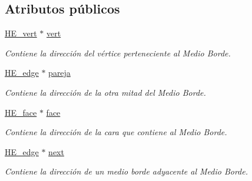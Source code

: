 \subsection*{Atributos públicos}
\begin{DoxyCompactItemize}
\item 
\hypertarget{class_h_e__edge_a0f2948558eb5c7e4c3b6d06df8c371d2}{\hyperlink{class_h_e__vert}{H\-E\-\_\-vert} $\ast$ \hyperlink{class_h_e__edge_a0f2948558eb5c7e4c3b6d06df8c371d2}{vert}}\label{class_h_e__edge_a0f2948558eb5c7e4c3b6d06df8c371d2}

\begin{DoxyCompactList}\small\item\em Contiene la dirección del vértice perteneciente al Medio Borde. \end{DoxyCompactList}\item 
\hypertarget{class_h_e__edge_abd18f9026e40fc0df490f3dd09554788}{\hyperlink{class_h_e__edge}{H\-E\-\_\-edge} $\ast$ \hyperlink{class_h_e__edge_abd18f9026e40fc0df490f3dd09554788}{pareja}}\label{class_h_e__edge_abd18f9026e40fc0df490f3dd09554788}

\begin{DoxyCompactList}\small\item\em Contiene la dirección de la otra mitad del Medio Borde. \end{DoxyCompactList}\item 
\hypertarget{class_h_e__edge_a64537a0992a9b54e9d254e7eec04f766}{\hyperlink{class_h_e__face}{H\-E\-\_\-face} $\ast$ \hyperlink{class_h_e__edge_a64537a0992a9b54e9d254e7eec04f766}{face}}\label{class_h_e__edge_a64537a0992a9b54e9d254e7eec04f766}

\begin{DoxyCompactList}\small\item\em Contiene la dirección de la cara que contiene al Medio Borde. \end{DoxyCompactList}\item 
\hypertarget{class_h_e__edge_aa002f397ba1ce28a16dc80ae30eb6a71}{\hyperlink{class_h_e__edge}{H\-E\-\_\-edge} $\ast$ \hyperlink{class_h_e__edge_aa002f397ba1ce28a16dc80ae30eb6a71}{next}}\label{class_h_e__edge_aa002f397ba1ce28a16dc80ae30eb6a71}

\begin{DoxyCompactList}\small\item\em Contiene la dirección de un medio borde adyacente al Medio Borde. \end{DoxyCompactList}\end{DoxyCompactItemize}


